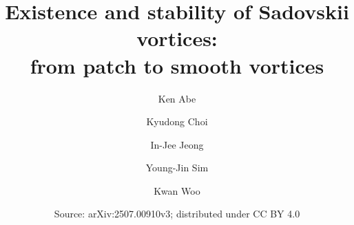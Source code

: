\documentclass[10pt,a4paper]{amsart}
\theoremstyle{definition}
\theoremstyle{definition}
\numberwithin{equation}{section}
\newcommand{\0}{\emptyset}
\begin{document}
\title{Existence and stability of Sadovskii vortices:\\
from patch to smooth vortices}
\author{Ken Abe}
\address{Department of Mathematics, Graduate School of Science, Osaka Metropolitan University, 3-3-138 Sugimoto, Sumiyoshi-ku Osaka, 558-8585, Japan.}
\author{Kyudong Choi}
\address{Department of Mathematical Sciences, Ulsan National Institute of Science and Technology, 50 UNIST-gil, Eonyang-eup, Ulju-gun, Ulsan 44919, Republic of Korea.}
\author{In-Jee Jeong}
\address{School of Mathematics, Korea Institute for Advanced Study, 85 Heogi-ro, Seoul 02455, Republic of Korea.}
\author{Young-Jin Sim}
\address{School of Mathematics, Korea Institute for Advanced Study, 85 Heogi-ro, Seoul 02455, Republic of Korea.}
\author{Kwan Woo}
\address{Departement Mathematik und Informatik, Universit\"at Basel, CH-4051 Basel, Switzerland.}
\date{Source: arXiv:2507.00910v3; distributed under CC BY 4.0}
\renewcommand{\thefootnote}{\fnsymbol{footnote}}
\renewcommand{\thefootnote}{\arabic{footnote}}
\end{document}
